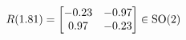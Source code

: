 \documentclass[preview]{standalone}
\begin{document}
\begin{align*}
\special{dvisvgm:raw <g id='unique000'>}R(1.81) = \begin{bmatrix} -0.23 & -0.97 \\ 0.97 & -0.23 \end{bmatrix} \in \text{SO}(2)\special{dvisvgm:raw </g>}
\end{align*}
\end{document}
